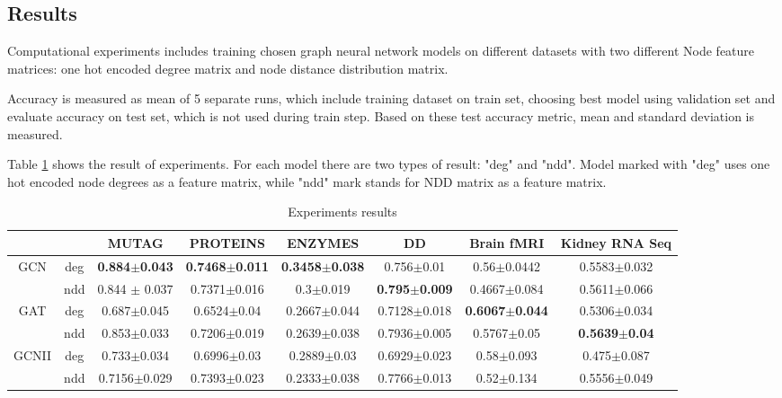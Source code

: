 \subsection{Results}

Computational experiments includes training chosen graph neural network models on different datasets with two different
Node feature matrices: one hot encoded degree matrix and node distance distribution matrix.

Accuracy is measured as mean of 5 separate runs, which include training dataset on train set, choosing
best model using validation set and evaluate accuracy on test set, which is not used during train step.
Based on these test accuracy metric, mean and standard deviation is measured.

Table \ref{tab:results} shows the result of experiments. For each model there are two types of result: "deg" and "ndd".
Model marked with "deg" uses one hot encoded node degrees as a feature matrix, while "ndd" mark stands for NDD matrix 
as a feature matrix.

\begin{table}[]
    \scriptsize
    \begin{tabular}{|c|c|c|c|c|c|c|c|}
        \hline
                               &     & MUTAG                 & PROTEINS               & ENZYMES                & DD                    & Brain fMRI             & Kidney RNA Seq        \\ \hline
        \multirow{2}{*}{GCN}   & deg & \textbf{0.884$\pm$0.043} & \textbf{0.7468$\pm$0.011} & \textbf{0.3458$\pm$0.038} & 0.756$\pm$0.01           & 0.56$\pm$0.0442           & 0.5583$\pm$0.032         \\
                               & ndd & 0.844 $\pm$ 0.037         & 0.7371$\pm$0.016          & 0.3$\pm$0.019             & \textbf{0.795$\pm$0.009} & 0.4667$\pm$0.084          & 0.5611$\pm$0.066         \\ \cline{1-8}
        \multirow{2}{*}{GAT}   & deg & 0.687$\pm$0.045          & 0.6524$\pm$0.04           & 0.2667$\pm$0.044          & 0.7128$\pm$0.018         & \textbf{0.6067$\pm$0.044} & 0.5306$\pm$0.034         \\
                               & ndd & 0.853$\pm$0.033          & 0.7206$\pm$0.019          & 0.2639$\pm$0.038          & 0.7936$\pm$0.005         & 0.5767$\pm$0.05           & \textbf{0.5639$\pm$0.04} \\ \cline{1-8}
        \multirow{2}{*}{GCNII} & deg & 0.733$\pm$0.034          & 0.6996$\pm$0.03           & 0.2889$\pm$0.03           & 0.6929$\pm$0.023         & 0.58$\pm$0.093            & 0.475$\pm$0.087          \\
                               & ndd & 0.7156$\pm$0.029         & 0.7393$\pm$0.023          & 0.2333$\pm$0.038          & 0.7766$\pm$0.013         & 0.52$\pm$0.134            & 0.5556$\pm$0.049         \\ \hline
    \end{tabular}
    \caption{Experiments results}
    \label{tab:results}
\end{table}

